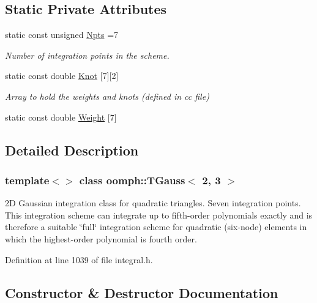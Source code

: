 \subsection*{Static Private Attributes}
\begin{DoxyCompactItemize}
\item 
static const unsigned \hyperlink{classoomph_1_1TGauss_3_012_00_013_01_4_a056ee4c02fcdd17b4de1740bfa1b3473}{Npts} =7
\begin{DoxyCompactList}\small\item\em Number of integration points in the scheme. \end{DoxyCompactList}\item 
static const double \hyperlink{classoomph_1_1TGauss_3_012_00_013_01_4_acb6d60be9546576219e42596be211842}{Knot} \mbox{[}7\mbox{]}\mbox{[}2\mbox{]}
\begin{DoxyCompactList}\small\item\em Array to hold the weights and knots (defined in cc file) \end{DoxyCompactList}\item 
static const double \hyperlink{classoomph_1_1TGauss_3_012_00_013_01_4_a64cf0175f3adc12733785facec339c63}{Weight} \mbox{[}7\mbox{]}
\end{DoxyCompactItemize}


\subsection{Detailed Description}
\subsubsection*{template$<$$>$\newline
class oomph\+::\+T\+Gauss$<$ 2, 3 $>$}

2D Gaussian integration class for quadratic triangles. Seven integration points. This integration scheme can integrate up to fifth-\/order polynomials exactly and is therefore a suitable \char`\"{}full\char`\"{} integration scheme for quadratic (six-\/node) elements in which the highest-\/order polynomial is fourth order. 

Definition at line 1039 of file integral.\+h.



\subsection{Constructor \& Destructor Documentation}
\mbox{\label{classoomph_1_1TGauss_3_012_00_013_01_4_a86b16fedd79283983a33badeca336fdc}} 
